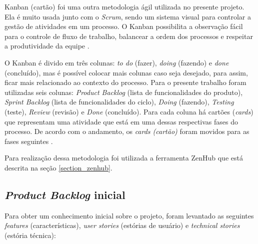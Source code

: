 Kanban (cartão) foi uma outra metodologia ágil utilizada no presente projeto. Ela é muito usada junto com o \textit{Scrum}, sendo um sistema visual para controlar a gestão de atividades em um processo. O Kanban possibilita a observação fácil para o controle de fluxo de trabalho, balancear a ordem dos processos e respeitar a produtividade da equipe \cite{ARTIA:2019}.

O Kanban é divido em três colunas: \textit{to do} (fazer), \textit{doing} (fazendo) e \textit{done} (concluído), mas é possível colocar mais colunas caso seja desejado, para assim, ficar mais relacionado ao contexto do processo. Para o presente trabalho foram utilizadas seis colunas: \textit{Product Backlog} (lista de funcionalidades do produto), \textit{Sprint Backlog} (lista de funcionalidades do ciclo), \textit{Doing} (fazendo), \textit{Testing} (teste), \textit{Review} (revisão) e \textit{Done} (concluído). Para cada coluna há cartões (\textit{cards}) que representam uma atividade que está em uma dessas respectivas fases do processo. De acordo com o andamento, os \textit{cards (cartão)} foram movidos para as fases seguintes \cite{ARTIA:2019}.

Para realização dessa metodologia foi utilizada a ferramenta ZenHub que está descrita na seção \ref{section_zenhub}.

\subsection{\textit{Product Backlog} inicial}
\label{section_product_backlog}

Para obter um conhecimento inicial sobre o projeto, foram levantado as seguintes \textit{features} (características), \textit{user stories} (estórias de usuário) e \textit{technical stories} (estória técnica):

